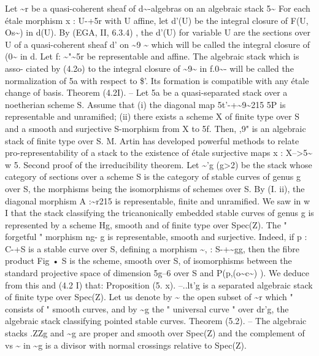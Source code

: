 \documentclass[11pt]{article}
\theoremstyle{plain}
\theoremstyle{definition}
\theoremstyle{remark}
\begin{document}
Let \textasciitilde{}r be a quasi-coherent sheaf of d\textasciitilde{}-algebras on an algebraic stack 5\textasciitilde{} For each étale morphism x : U-+5r with U affine, let d'(U) be the integral closure of F(U, Os\textasciitilde{}) in d(U). By (EGA, II, 6.3.4) , the d'(U) for variable U are the sections over U of a quasi-coherent sheaf d' on \textasciitilde{}9 \textasciitilde{} which will be called the integral closure of (0\textasciitilde{} in d. Let f: \textasciitilde{}"\textasciitilde{}5r be representable and affine. The algebraic stack which is asso- ciated by (4.2o) to the integral closure of \textasciitilde{}9\textasciitilde{} in f.0\textasciitilde{}- will be called the normalization of 5a with respect to \$'. Its formation is compatible with any étale change of basis. Theorem (4.2I). -- Let 5a be a quasi-separated stack over a noetherian scheme S. Assume that (i) the diagonal map 5t'-+\textasciitilde{}9\textasciitilde{}215 5P is representable and unramified; (ii) there exists a scheme X of finite type over S and a smooth and surjective S-morphism from X to 5f. Then, ,9" is an algebraic stack of finite type over S. M. Artin has developed powerful methods to relate pro-representability of a stack to the existence of étale surjective maps x : X-->5\textasciitilde{} w 5. Second proof of the irreducibility theorem. Let \textasciitilde{}'g (g>2) be the stack whose category of sections over a scheme S is the category of stable curves of genus g over S, the morphisms being the isomorphisms of schemes over S. By (I. ii), the diagonal morphism A :\textasciitilde{}r215 is representable, finite and unramified. We saw in w I that the stack classifying the tricanonically embedded stable curves of genus g is represented by a scheme Hg, smooth and of finite type over Spec(Z). The " forgetful " morphism ng- g is representable, smooth and surjective. Indeed, if p : C-+S is a stable curve over S, defining a morphism \textasciitilde{}, : S-+\textasciitilde{}gg, then the fibre product Fig • S is the scheme, smooth over S, of isomorphisms between the standard projective space of dimension 5g--6 over S and P(p,(o\textasciitilde{}c\textasciitilde{}) ). We deduce from this and (4.2 I) that: Proposition (5. x). --..lt'g is a separated algebraic stack of finite type over Spec(Z). Let us denote by \textasciitilde{} the open subset of \textasciitilde{}r which " consists of " smooth curves, and by \textasciitilde{}g the " universal curve " over dr'g, the algebraic stack classifying pointed stable curves. Theorem (5.2). -- The algebraic stacks .ZZg and \textasciitilde{}g are proper and smooth over Spec(Z) and the complement of vs \textasciitilde{} in \textasciitilde{}g is a divisor with normal crossings relative to Spec(Z).
\end{document}
